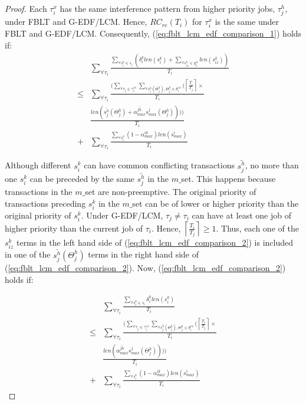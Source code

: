 \documentclass[conference]{IEEEtran}
\begin{document}
\begin{proof}
 
 Each $\tau_i^x$ has the same interference pattern from higher priority jobs, $\tau_j^h$, under FBLT and G-EDF/LCM. Hence, $RC_{re}(T_i)$ for $\tau_i^x$ is the same under FBLT and G-EDF/LCM. Consequently, (\ref{eq:fblt_lcm_edf_comparison_1}) holds if:
 \begin{eqnarray}
 & \sum_{\forall\tau_{i}}\frac{\sum_{\forall s_{i}^{k}\in s_{i}}\left(\delta_{i}^{k}len\left(s_{i}^{k}\right)+\sum_{\forall s_{iz}^{k}\in\chi_{i}^{k}}len\left(s_{iz}^{k}\right)\right)}{T_{i}}\nonumber\\
\le & \sum_{\forall\tau_{i}}\frac{\Bigg(\sum_{\forall\tau_{j}\in\gamma_{i}^{ex}}\sum_{\forall s_{i}^{h}\left(\Theta_{j}^{h}\right),\Theta_{j}^{h}\in\theta_{i}^{ex}}\Bigg(\left\lceil \frac{T_{i}}{T_{j}}\right\rceil \times}{T_{i}}\nonumber\\
 & \frac{len\left(\bar{s_{j}^{h}}(\Theta_{j}^{h})+\bar{\alpha_{max}^{jh}}s_{max}^{j}(\Theta_{j}^{h})\right)\Bigg)\Bigg)}{T_{i}}\nonumber\\
+ & \sum_{\forall\tau_{i}}\frac{\sum_{\forall s_{i}^{k}}\left(1-\alpha_{max}^{ik}\right)len\left(s_{max}^{i}\right)}{T_{i}}\label{eq:fblt_lcm_edf_comparison_2}
\end{eqnarray}

Although different $s_{i}^{k}$ can have common conflicting transactions
$\bar{s_{j}^{h}}$, no more than one $s_{i}^{k}$ can be preceded
by the same $\bar{s_{j}^{h}}$ in the $m\_$set. This happens because
transactions in the $m\_$set are non-preemptive. The original priority
of transactions preceding $s_{i}^{k}$ in the $m\_$set can be of
lower or higher priority than the original priority of $s_{i}^{k}$. Under
G-EDF/LCM, $\tau_{j}\ne\tau_{i}$ can have at least one job of higher
priority than the current job of $\tau_{i}$. Hence, $\left\lceil \frac{T_{i}}{T_{j}}\right\rceil \ge1$.
Thus, each one of the $s_{iz}^{k}$ terms in the left hand side of (\ref{eq:fblt_lcm_edf_comparison_2}) is included in one of the $\bar{s_{j}^{h}}(\Theta_j^h)$ terms in the right hand side of (\ref{eq:fblt_lcm_edf_comparison_2}). Now, (\ref{eq:fblt_lcm_edf_comparison_2}) holds if: 

\begin{eqnarray}
 & \sum_{\forall\tau_{i}}\frac{\sum_{\forall s_{i}^{k}\in s_{i}}\delta_i^klen(s_{i}^{k})}{T_{i}}\label{eq:fblt_lcm_edf_comparison_4}\\
\le & \sum_{\forall\tau_{i}}\frac{\Bigg(\sum_{\forall\tau_{j}\in\gamma_{i}^{ex}}\sum_{\forall\bar{s_{j}^{h}}(\Theta_j^h),\Theta_j^h\in\theta_{i}^{ex}}\Bigg(\left\lceil \frac{T_{i}}{T_{j}}\right\rceil\times}{T_{i}} \nonumber \\
& \frac{len\left(\bar{\alpha_{max}^{jh}}s_{max}^{j}(\Theta_j^h)\right)\Bigg)\Bigg)}{T_i}\nonumber\\
+ & \sum_{\forall\tau_{i}}\frac{\sum_{\forall s_{i}^{k}}\left(1-\alpha_{max}^{ik}\right)len\left(s_{max}^{i}\right)}{T_{i}}\nonumber 
\end{eqnarray}


\end{proof}
\end{document}
